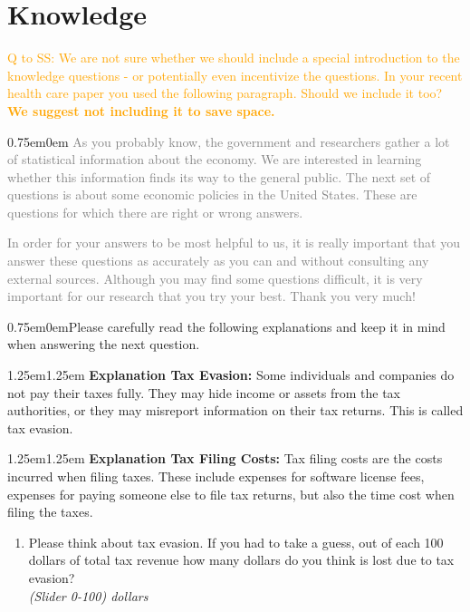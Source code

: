 \documentclass[11pt]{article}
\newcommand{\tk}[1]{\textcolor{orange}{#1}}
\begin{document}
\section*{Knowledge}
\tk{Q to SS: We are not sure whether we should include a special introduction to the knowledge questions - or potentially even incentivize the questions. In your recent health care paper you used the following paragraph. Should we include it too? \textbf{We suggest not including it to save space.}}
\\
\begin{adjustwidth}{0.75em}{0em}
\textcolor{gray}{As you probably know, the government and researchers gather a lot of statistical information about the economy. We are interested in learning whether this information finds its way to the general public. The next set of questions is about some economic policies in the United States. These are questions for which there are right or wrong answers.}

\textcolor{gray}{In order for your answers to be most helpful to us, it is really important that you answer these questions as accurately as you can and without consulting any external sources. Although you may find some questions difficult, it is very important for our research that you try your best. Thank you very much!}
\end{adjustwidth}
\vspace{0.5em}
\begin{adjustwidth}{0.75em}{0em}Please carefully read the following explanations and keep it in mind when answering the next question.\end{adjustwidth} 
\vspace{0.5em}
\begin{adjustwidth}{1.25em}{1.25em} 
\textbf{Explanation Tax Evasion:} Some individuals and companies do not pay their taxes fully. They may hide income or assets from the tax authorities, or they may misreport information on their tax returns. This is called tax evasion. 
\end{adjustwidth}
\begin{adjustwidth}{1.25em}{1.25em} \textbf{Explanation Tax Filing Costs:} Tax filing costs are the costs incurred when filing taxes. These include expenses for software license fees, expenses for paying someone else to file tax returns, but also the time cost when filing the taxes. 
\end{adjustwidth}
\vspace{0.5em}
\begin{enumerate}[resume]
    \item Please think about tax evasion. If you had to take a guess, out of each 100 dollars of total tax revenue how many dollars do you think is lost due to tax evasion? \\
    \textit{(Slider 0-100) dollars} 
\end{enumerate}
\end{document}
